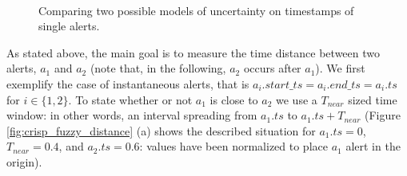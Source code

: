 \begin{figure}[p]
  \centering
  \\

  
  \caption{Comparing two possible models of uncertainty on timestamps of single alerts.}
  \label{fig:fuzzy_delay}
\end{figure}

As stated above, the main goal is to measure the time distance between two alerts, $a_{1}$ and $a_{2}$ (note that, in the following, $a_{2}$ occurs after $a_{1}$). We first exemplify the case of instantaneous alerts, that is $a_{i}.start\_ts = a_{i}.end\_ts = a_{i}.ts$ for $i \in \{1, 2\}$. To state whether or not $a_{1}$ is close to $a_{2}$ we use a $T_{near}$ sized time window: in other words, an interval spreading from $a_{1}.ts$ to $a_{1}.ts + T_{near}$ (Figure \ref{fig:crisp_fuzzy_distance} (a) shows the described situation for $a_{1}.ts = 0$, $T_{near} = 0.4$, and $a_{2}.ts = 0.6$: values have been normalized to place $a_{1}$ alert in the origin).

